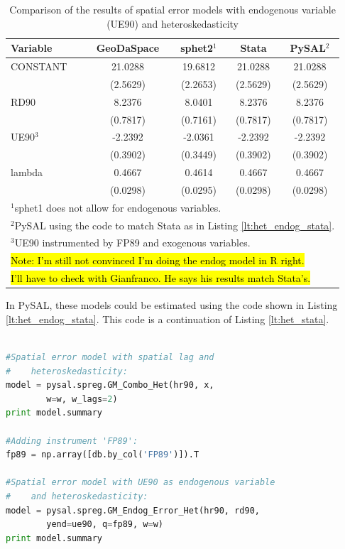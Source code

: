 \documentclass{article}
\begin{document}
\begin{table}[htpb]
\caption{Comparison of the results of spatial error models with endogenous variable (UE90) and heteroskedasticity}
\label{t:res_het_endog}
\centering
\begin{small}
\begin{tabular}{l|cccc} \hline
\textbf{Variable}&\textbf{GeoDaSpace}&\textbf{sphet2$^1$}&\textbf{Stata}&\textbf{PySAL$^2$}\\ \hline
CONSTANT&21.0288&19.6812&21.0288&21.0288\\
&(2.5629)&(2.2653)&(2.5629)&(2.5629)\\
RD90&8.2376&8.0401&8.2376&8.2376\\
&(0.7817)&(0.7161)&(0.7817)&(0.7817)\\
UE90$^3$&-2.2392&-2.0361&-2.2392&-2.2392\\
&(0.3902)&(0.3449)&(0.3902)&(0.3902)\\
lambda&0.4667&0.4614&0.4667&0.4667\\
&(0.0298)&(0.0295)&(0.0298)&(0.0298)\\
\hline
\multicolumn{5}{l}{\scriptsize{$^1$sphet1 does not allow for endogenous variables.}} \\
\multicolumn{5}{l}{\scriptsize{$^2$PySAL using the code to match Stata as in Listing \ref{lt:het_endog_stata}.}} \\
\multicolumn{5}{l}{\scriptsize{$^3$UE90 instrumented by FP89 and exogenous variables.}} \\
\multicolumn{5}{l}{\scriptsize{\hl{Note: I'm still not convinced I'm doing the endog model in R right.}}} \\
\multicolumn{5}{l}{\scriptsize{\hl{I'll have to check with Gianfranco. He says his results match Stata's.}}} \\
\end{tabular}
\end{small}
\end{table}


In PySAL, these models could be estimated using the code shown in Listing \ref{lt:het_endog_stata}. This code is a continuation of Listing \ref{lt:het_stata}.

\begin{code}
\begin{lstlisting}[label=lt:het_endog_stata,caption=Using PySAL to match the results of spatial error models with heteroskedasticity and endogenous variables or spatial lag from Stata,language=Python]

#Spatial error model with spatial lag and
#    heteroskedasticity:
model = pysal.spreg.GM_Combo_Het(hr90, x,
        w=w, w_lags=2)
print model.summary

#Adding instrument 'FP89':
fp89 = np.array([db.by_col('FP89')]).T

#Spatial error model with UE90 as endogenous variable
#    and heteroskedasticity:
model = pysal.spreg.GM_Endog_Error_Het(hr90, rd90,
        yend=ue90, q=fp89, w=w)
print model.summary

\end{lstlisting}
\end{code}
\FloatBarrier
\end{document}
